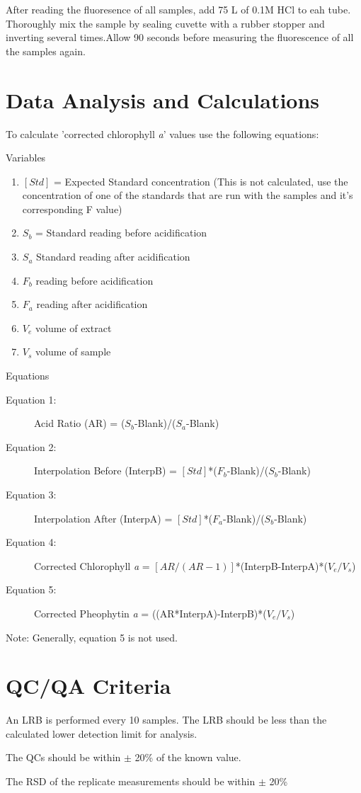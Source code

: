 \documentclass[12pt]{../SOP3_alpha}
\begin{document}
\NP After reading the fluoresence of all samples, add 75 \micro L of  0.1M HCl to eah tube. Thoroughly mix the sample by sealing cuvette with a rubber stopper and inverting several times.Allow 90 seconds before measuring the fluorescence of all the samples again. 

\section{Data Analysis and Calculations}
To calculate 'corrected chlorophyll \textit{a}' values use the following equations: %

\NP Variables
\begin{enumerate}
\item $[Std]$ = Expected Standard concentration (This is not calculated, use the concentration of one of the standards that are run with the samples and it's corresponding F value)
\item $S_b$ = Standard reading before acidification
\item $S_a$ Standard reading after acidification
\item $F_b$ reading before acidification
\item $F_a$ reading after acidification
\item $V_e$ volume of extract
\item $V_s$ volume of sample 
\end{enumerate}

\NP Equations
\begin{description}
\item[Equation 1:] Acid Ratio (AR) = ($S_b$-Blank)/($S_a$-Blank)
\item[Equation 2:] Interpolation Before (InterpB) = $[Std]$*($F_b$-Blank)/($S_b$-Blank)
\item[Equation 3:] Interpolation After (InterpA) = $[Std]$*($F_a$-Blank)/($S_b$-Blank)
\item[Equation 4:] Corrected Chlorophyll \textit{a} = $[AR/(AR-1)]$*(InterpB-InterpA)*($V_e/V_s$)
\item[Equation 5:] Corrected Pheophytin \textit{a} = ((AR*InterpA)-InterpB)*($V_e/V_s$)
\end{description}
Note: Generally, equation 5 is not used. 

\section{QC/QA Criteria}

\NP An LRB is performed every 10 samples. The LRB should be less than the calculated lower detection limit for analysis.

\NP The QCs should be within $\pm$ 20\% of the known value. 

\NP The RSD of the replicate measurements should be within $\pm$ 20\%
\end{document}
